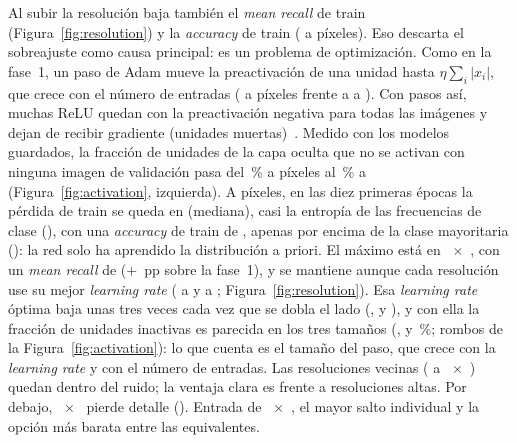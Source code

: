 {Al subir la resolución baja también el \emph{mean recall} de train (Figura~\ref{fig:resolution}) y la
\emph{accuracy} de train ( a  píxeles). Eso descarta el sobreajuste como causa
principal: es un problema de optimización. Como en la fase~1, un paso de Adam mueve la preactivación de una unidad
hasta $\eta \sum_i |x_i|$, que crece con el número de entradas ( a  píxeles frente a
 a ). Con pasos así, muchas ReLU quedan con la preactivación negativa para todas las
imágenes y dejan de recibir gradiente (unidades muertas)~\cite{goodfellow}. Medido con los modelos guardados, la
fracción de unidades de la capa oculta que no se activan con ninguna imagen de validación pasa del
\,\% a  píxeles al \,\% a 
(Figura~\ref{fig:activation}, izquierda). A  píxeles, en las diez primeras épocas la pérdida de train
se queda en  (mediana), casi la entropía de las frecuencias de clase (),
con una \emph{accuracy} de train de , apenas por encima de la clase mayoritaria
(): la red solo ha aprendido la distribución a priori.}
{El máximo está en ~$\times$~, con un \emph{mean recall} de 
(+~pp sobre la fase~1), y se mantiene aunque cada resolución use su mejor \emph{learning rate}
( a  y  a ;
Figura~\ref{fig:resolution}). Esa \emph{learning rate} óptima baja unas tres veces cada vez que se dobla el lado
(,  y ), y con ella la fracción de unidades inactivas es
parecida en los tres tamaños (,  y \,\%;
rombos de la Figura~\ref{fig:activation}): lo que cuenta es el tamaño del paso, que crece con la \emph{learning rate} y
con el número de entradas. Las resoluciones vecinas ( a ~$\times$~)
quedan dentro del ruido; la ventaja clara es frente a resoluciones altas. Por debajo, ~$\times$~
pierde detalle ().}
{Entrada de ~$\times$~, el mayor salto individual y la opción más barata entre las
equivalentes.}

